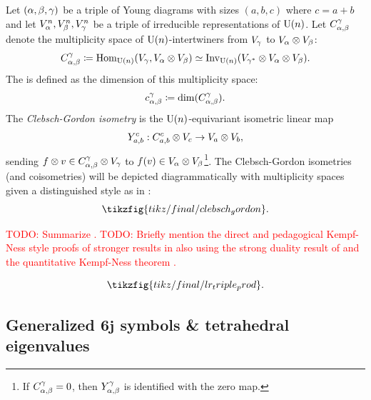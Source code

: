\documentclass[notitlepage, 10pt]{article}
\begin{document}
\begin{defn}
    \label{defn:lr_coeffs}
    Let $(\alpha, \beta, \gamma)$ be a triple of Young diagrams with sizes $(a,b,c)$ where $c=a+b$ and let $V_{\alpha}^n,V_{\beta}^n,V_{\gamma}^n$ be a triple of irreducible representations of $\operatorname{U}(n)$.
    Let $C_{\alpha, \beta}^{\gamma}$ denote the multiplicity space of $\operatorname{U}(n)$-intertwiners from $V_{\gamma}$ to $V_{\alpha} \otimes V_{\beta}$:
    \begin{equation}
        C_{\alpha, \beta}^{\gamma} \coloneqq \operatorname{Hom}_{\operatorname{U}(n)}(V_{\gamma}, V_{\alpha}\otimes V_{\beta}) \simeq \operatorname{Inv}_{\operatorname{U}(n)}(V_{\gamma^*} \otimes V_{\alpha} \otimes V_{\beta}).
    \end{equation}
    The  is defined as the dimension of this multiplicity space:
    \begin{equation}
        c_{\alpha,\beta}^{\gamma} \coloneqq \dim(C_{\alpha, \beta}^{\gamma}).
    \end{equation}
    The \textit{Clebsch-Gordon isometry} is the $\operatorname{U}(n)$-equivariant isometric linear map 
    \begin{equation}
        Y_{a,b}^{c} : C_{a,b}^{c} \otimes V_{c} \to V_{a} \otimes V_{b},
    \end{equation}
    sending $f \otimes v \in C_{\alpha,\beta}^{\gamma} \otimes V_{\gamma}$ to $f(v) \in V_{\alpha}\otimes V_{\beta}$\footnote{If $C_{\alpha,\beta}^{\gamma} = 0$, then $Y_{\alpha,\beta}^{\gamma}$ is identified with the zero map.}.
    The Clebsch-Gordon isometries (and coisometries) will be depicted diagrammatically with multiplicity spaces given a distinguished style as in \cite{agrawala1968graphical}:
    \begin{equation}
        \tikzfig{tikz/final/clebsch_gordon}.
    \end{equation}
\end{defn}

\textcolor{red}{TODO: Summarize \cite{christandl2008quantum}.}
\textcolor{red}{TODO: Briefly mention the direct and pedagogical Kempf-Ness style proofs of stronger results in \cite[Proposition 2.3]{berline2018horn} also using the strong duality result of \cite[Theorem 1 \& Proposition 3.1]{franks2020minimal} and the quantitative Kempf-Ness theorem \cite[Theorem 1.17]{burgisser2019towards}.}


\begin{equation}
    \label{eq:lr_triple_prod}
    \tikzfig{tikz/final/lr_triple_prod}.
\end{equation}


\subsection{Generalized \texorpdfstring{$\boldsymbol{6j}$}{6j} symbols \& tetrahedral eigenvalues}
\label{sec:sixj_tet}
\end{document}
